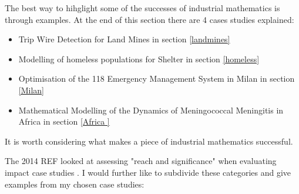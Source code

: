 \documentclass[11pt]{article} %
\begin{document}
	The best way to hihglight some of the successes of industrial mathematics is through examples. At the end of this section there are 4 cases studies explained: 
	\begin{itemize}
		\item Trip Wire Detection for Land Mines in section \ref{landmines}
		\item Modelling of homeless populations for Shelter in section \ref{homeless}
		\item Optimisation of the 118 Emergency Management System in Milan in section \ref{Milan}
		\item Mathematical Modelling of the Dynamics of Meningococcal Meningitis in Africa in section \ref{Africa }
	\end{itemize}

It is worth considering what makes a piece of industrial mathematics successful. 

The 2014 REF looked at assessing "reach and significance" when evaluating impact case studies \cite{impactcriteria2014}. I would further like to subdivide these categories and give examples from my chosen case studies:
\end{document}

